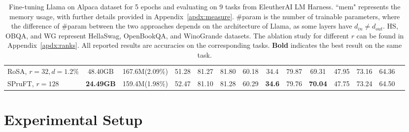 \begin{table*}[htbp]
\begin{center}
\begin{tabular}{lccccccccccccc}
RoSA, $r=32, d=1.2\%$ & 48.40GB & 167.6M(2.09\%) & 51.28 & 81.27 & 81.80 & 60.18 & 34.4 & 79.87 & 69.31 & 47.95 & 73.16 & 64.36\\
SPruFT, $r=128$ & \textbf{24.49GB} & 159.4M(1.98\%) & 52.47 & 81.10 & 81.28 & 60.29 & \textbf{34.6} & 79.76 & \textbf{70.04} & 47.75 & 73.24 & 64.50 %
\\\bottomrule
\end{tabular}
\caption{Fine-tuning Llama on Alpaca dataset for 5 epochs and evaluating on 9 tasks from EleutherAI LM Harness. ``mem" represents the memory usage, with further details provided in Appendix~\ref{apdx:measure}. \#param is the number of trainable parameters, where the difference of \#param between the two approaches depends on the architecture of Llama, as some layers have $d_{in} \neq d_{out}$. %
HS, OBQA, and WG represent HellaSwag, OpenBookQA, and WinoGrande datasets. %
The ablation study for different $r$ can be found in Appendix~\ref{apdx:ranks}. All reported results are accuracies on the corresponding tasks. \textbf{Bold} indicates the best result on the same task. } \label{tab:llm} 
\end{center}
\end{table*}

\section{Experimental Setup}\label{sec:setup}


